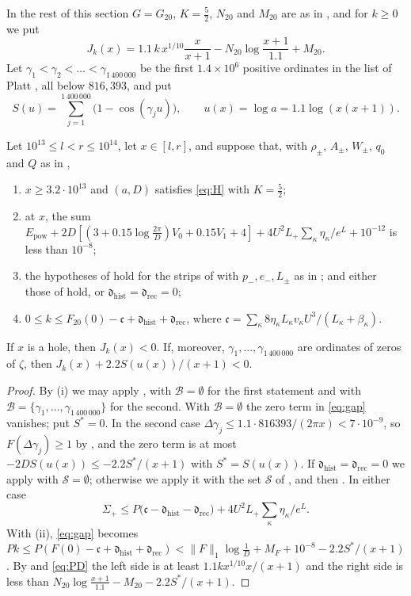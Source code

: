 \documentclass[11pt,colorlinks]{charlie}
\newcommand{\cB}{\mathcal B}
\newcommand{\cS}{\mathcal S}
\begin{document}
In the rest of this section $G=G_{20}$, $K=\frac52$, $N_{20}$ and $M_{20}$ are as in , and for $k\ge0$ we put
\[
 J_k(x)=1.1\,k\,x^{1/10}\frac x{x+1}-N_{20}\log\frac{x+1}{1.1}+M_{20}.
\]
Let $\gamma_1<\gamma_2<\dots<\gamma_{1\,400\,000}$ be the first $1.4\times10^6$ positive ordinates in the list of Platt \cite{Platt,LMFDB}, all below $816{,}393$, and put
\[
 S(u)=\sum_{j=1}^{1\,400\,000}\big(1-\cos(\gamma_ju)\big),\qquad u(x)=\log a=1.1\log(x(x+1)).
\]

\begin{lemma}\label{lem:slab}
Let $10^{13}\le l<r\le10^{14}$, let $x\in[l,r]$, and suppose that, with $\rho_\pm$, $A_\pm$, $W_\pm$, $q_0$ and $Q$ as in ,
\begin{enumerate}[label=(\roman*)]
\item $x\ge3.2\cdot10^{13}$ and $(a,D)$ satisfies \eqref{eq:H} with $K=\frac52$;
\item at $x$, the sum $E_{\mathrm{pow}}+2D[(3+0.15\log\frac{2\pi}D)V_0+0.15V_1+4]+4U^2L_+\sum_\kappa\eta_\kappa/e^L+10^{-12}$ is less than $10^{-8}$;
\item the hypotheses of  hold for the strips of  with $p_-,e_-,L_\pm$ as in ; and either those of  hold, or $\mathfrak d_{\mathrm{hist}}=\mathfrak d_{\mathrm{rec}}=0$;
\item $0\le k\le F_{20}(0)-\mathfrak c+\mathfrak d_{\mathrm{hist}}+\mathfrak d_{\mathrm{rec}}$, where $\mathfrak c=\sum_\kappa8\eta_\kappa L_\kappa v_\kappa U^3/(L_\kappa+\beta_\kappa)$.
\end{enumerate}
If $x$ is a hole, then $J_k(x)<0$. If, moreover, $\gamma_1,\dots,\gamma_{1\,400\,000}$ are ordinates of zeros of $\zeta$, then $J_k(x)+2.2S(u(x))/(x+1)<0$.
\end{lemma}
\begin{proof}
By (i) we may apply , with $\cB=\emptyset$ for the first statement and with $\cB=\{\gamma_1,\dots,\gamma_{1\,400\,000}\}$ for the second. With $\cB=\emptyset$ the zero term in \eqref{eq:gap} vanishes; put $S^*=0$. In the second case $\Delta\gamma_j\le1.1\cdot816393/(2\pi x)<7\cdot10^{-9}$, so $F(\Delta\gamma_j)\ge1$ by , and the zero term is at most $-2DS(u(x))\le-2.2S^*/(x+1)$ with $S^*=S(u(x))$. If $\mathfrak d_{\mathrm{hist}}=\mathfrak d_{\mathrm{rec}}=0$ we apply  with $\cS=\emptyset$; otherwise we apply it with the set $\cS$ of , and then . In either case
\[
 \Sigma_+\le P\big(\mathfrak c-\mathfrak d_{\mathrm{hist}}-\mathfrak d_{\mathrm{rec}}\big)+4U^2L_+\sum_\kappa\eta_\kappa/e^L .
\]
With (ii), \eqref{eq:gap} becomes $Pk\le P(F(0)-\mathfrak c+\mathfrak d_{\mathrm{hist}}+\mathfrak d_{\mathrm{rec}})<\|F\|_1\log\frac1D+M_F+10^{-8}-2.2S^*/(x+1)$. By  and \eqref{eq:PD} the left side is at least $1.1kx^{1/10}x/(x+1)$ and the right side is less than $N_{20}\log\frac{x+1}{1.1}-M_{20}-2.2S^*/(x+1)$.
\end{proof}
\end{document}
